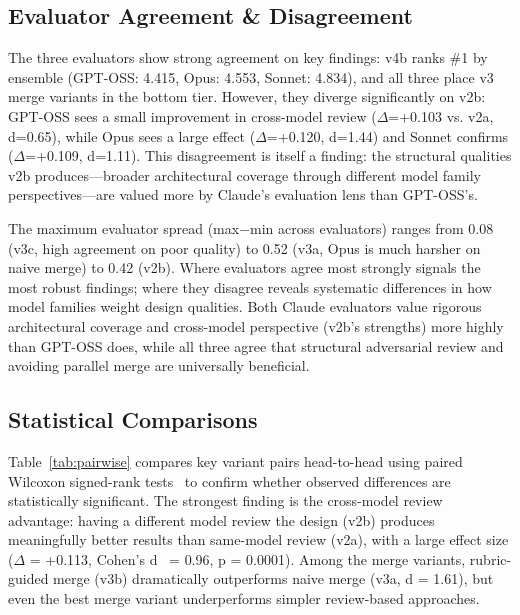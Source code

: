 \documentclass[conference]{IEEEtran}
\begin{document}
\subsection{Evaluator Agreement \& Disagreement}

The three evaluators show strong agreement on key findings: v4b ranks \#1 by ensemble (GPT-OSS: 4.415, Opus: 4.553, Sonnet: 4.834), and all three place v3 merge variants in the bottom tier. However, they diverge significantly on v2b: GPT-OSS sees a small improvement in cross-model review ($\Delta$=+0.103 vs. v2a, d=0.65), while Opus sees a large effect ($\Delta$=+0.120, d=1.44) and Sonnet confirms ($\Delta$=+0.109, d=1.11). This disagreement is itself a finding: the structural qualities v2b produces---broader architectural coverage through different model family perspectives---are valued more by Claude's evaluation lens than GPT-OSS's.

The maximum evaluator spread (max$-$min across evaluators) ranges from 0.08 (v3c, high agreement on poor quality) to 0.52 (v3a, Opus is much harsher on naive merge) to 0.42 (v2b). Where evaluators agree most strongly signals the most robust findings; where they disagree reveals systematic differences in how model families weight design qualities. Both Claude evaluators value rigorous architectural coverage and cross-model perspective (v2b's strengths) more highly than GPT-OSS does, while all three agree that structural adversarial review and avoiding parallel merge are universally beneficial.

\subsection{Statistical Comparisons}

Table~\ref{tab:pairwise} compares key variant pairs head-to-head using paired Wilcoxon signed-rank tests~\cite{wilcoxon} to confirm whether observed differences are statistically significant. The strongest finding is the cross-model review advantage: having a different model review the design (v2b) produces meaningfully better results than same-model review (v2a), with a large effect size ($\Delta$ = +0.113, Cohen's d~\cite{cohen} = 0.96, p = 0.0001). Among the merge variants, rubric-guided merge (v3b) dramatically outperforms naive merge (v3a, d = 1.61), but even the best merge variant underperforms simpler review-based approaches.
\end{document}
